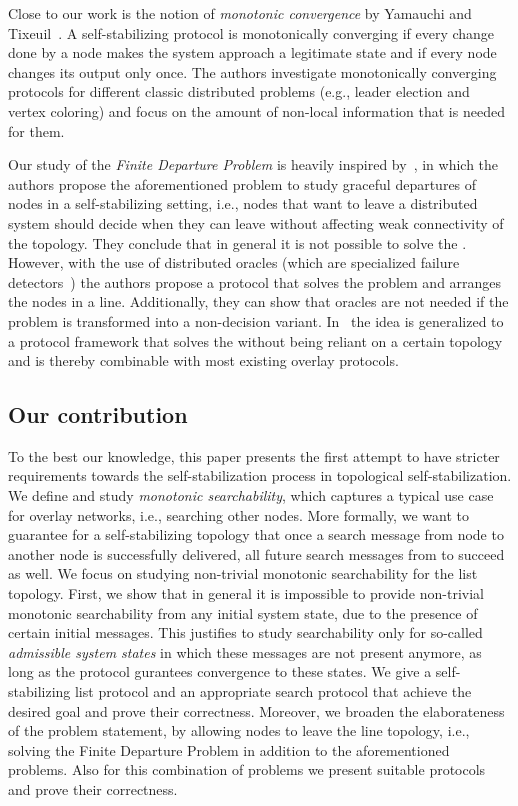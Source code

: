 \documentclass[a4paper,USenglish]{lipics}
\newcommand{\fdp}{\xspace}
\begin{document}
Close to our work is the notion of \emph{monotonic convergence} by Yamauchi and Tixeuil~\cite{YamauchiT10}. A self-stabilizing protocol is monotonically converging if every change done by a node  makes the system approach a legitimate state and if every node changes its output only once. 
The authors investigate monotonically converging protocols for different classic distributed problems (e.g., leader election and vertex coloring) and focus on the amount of non-local information that is needed for them.

Our study of the \emph{Finite Departure Problem} is heavily inspired by~\cite{departure1}, in which the authors propose the aforementioned problem to study graceful departures of nodes in a self-stabilizing setting, i.e., nodes that want to leave a distributed system should decide when they can leave without affecting weak connectivity of the topology. 
They conclude that in general it is not possible to solve the \fdp. 
However, with the use of distributed oracles (which are specialized failure detectors~\cite{ChandraT96}) the authors propose a protocol that solves the problem and arranges the nodes in a line. 
Additionally, they can show that oracles are not needed if the problem is transformed into a non-decision variant. 
In~\cite{KoutsopoulosSS15} the idea is generalized to a protocol framework that solves the \fdp without being reliant on a certain topology and is thereby combinable with most existing overlay protocols.

\subsection{Our contribution}
To the best our knowledge, this paper presents the first attempt to have stricter requirements towards the self-stabilization process in topological self-stabilization.
We define and study \emph{monotonic searchability}, which captures a typical use case for overlay networks, i.e., searching other nodes.
More formally, we want to guarantee for a self-stabilizing topology that once a search message from node  to another node  is successfully delivered, all future search messages from  to  succeed as well.
We focus on studying non-trivial monotonic searchability for the list topology.
First, we show that in general it is impossible to provide non-trivial monotonic searchability from any initial system state, due to the presence of certain initial messages.
This justifies to study searchability only for so-called \emph{admissible system states} in which  these messages are not present anymore, as long as the protocol gurantees convergence to these states.
We give a self-stabilizing list protocol and an appropriate search protocol that achieve the desired goal and prove their correctness.
Moreover, we broaden the elaborateness of the problem statement, by allowing nodes to leave the line topology, i.e., solving the Finite Departure Problem in addition to the aforementioned problems. 
Also for this combination of problems we present suitable protocols and prove their correctness. 
\end{document}
